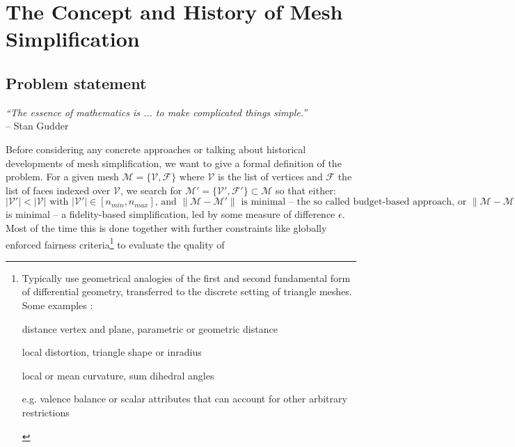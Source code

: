 \chapter{The Concept and History of Mesh Simplification}
\label{simplification0}

\section{Problem statement}
\label{simplification1}

\begin{flushright}
\textit{``The essence of mathematics is ... to make complicated things simple.''}\\
-- Stan Gudder
\end{flushright}

Before considering any concrete approaches or talking about historical developments of mesh simplification, we want to give a formal definition of the problem.
For a given mesh $\mathcal{M} = \{\mathcal{V},\mathcal{F}\}$ where $\mathcal{V}$ is the list of vertices and $\mathcal{F}$ the list of faces indexed over $\mathcal{V}$, we search for $\mathcal{M'=\{\mathcal{V'},\mathcal{F'}\} \subset M}$ so that either:
$|\mathcal{V'}|<|\mathcal{V}| \text{ with } |\mathcal{V'}| \in [n_{min}, n_{max}] \text{, and } \|\mathcal{M}-\mathcal{M'}\| \text{ is minimal -- the so called budget-based approach, or } \|\mathcal{M}-\mathcal{M'}\| < \epsilon \text{ and } |\mathcal{V'}| $ is minimal -- a fidelity-based simplification, led by some measure of difference $\epsilon$.
Most of the time this is done together with further constraints like globally enforced fairness criteria\footnote{ Typically use geometrical analogies of the first and second fundamental form of  differential geometry, transferred to the discrete setting of triangle meshes. Some examples \citep[cf.][]{Schroder2003}:
\begin{itemize}
{\setlength\itemindent{14pt} \item[Order 0: ] distance vertex and plane, parametric or geometric distance}
{\setlength\itemindent{14pt} \item[Order 1: ] local distortion, triangle shape or inradius}
{\setlength\itemindent{14pt} \item[Order 2: ] local or mean curvature, sum dihedral angles}
{\setlength\itemindent{14pt} \item[No order: ] e.g. valence balance or scalar attributes that can account for other arbitrary restrictions}
\end{itemize}} to evaluate the quality of
